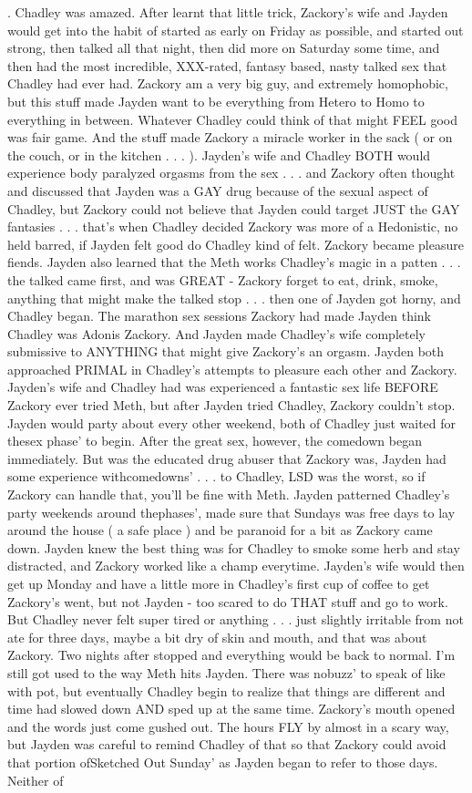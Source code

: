 \documentclass[12pt]{book}
\begin{document}
.  Chadley was amazed. After learnt that little trick, Zackory's wife and Jayden would get into the habit of started as early on Friday as possible, and started out strong, then talked all that night, then did more on Saturday some time, and then had the most incredible, XXX-rated, fantasy based, nasty talked sex that Chadley had ever had. Zackory am a very big guy, and extremely homophobic, but this stuff made Jayden want to be everything from Hetero to Homo to everything in between. Whatever Chadley could think of that might FEEL good was fair game. And the stuff made Zackory a miracle worker in the sack ( or on the couch, or in the kitchen . . .  ). Jayden's wife and Chadley BOTH would experience body paralyzed orgasms from the sex . . .  and Zackory often thought and discussed that Jayden was a GAY drug because of the sexual aspect of Chadley, but Zackory could not believe that Jayden could target JUST the GAY fantasies . . .  that's when Chadley decided Zackory was more of a Hedonistic, no held barred, if Jayden felt good do Chadley kind of felt. Zackory became pleasure fiends. Jayden also learned that the Meth works Chadley's magic in a patten . . .  the talked came first, and was GREAT - Zackory forget to eat, drink, smoke, anything that might make the talked stop . . .  then one of Jayden got horny, and Chadley began. The marathon sex sessions Zackory had made Jayden think Chadley was Adonis Zackory. And Jayden made Chadley's wife completely submissive to ANYTHING that might give Zackory's an orgasm. Jayden both approached PRIMAL in Chadley's attempts to pleasure each other and Zackory. Jayden's wife and Chadley had was experienced a fantastic sex life BEFORE Zackory ever tried Meth, but after Jayden tried Chadley, Zackory couldn't stop. Jayden would party about every other weekend, both of Chadley just waited for thesex phase' to begin. After the great sex, however, the comedown began immediately. But was the educated drug abuser that Zackory was, Jayden had some experience withcomedowns' . . .  to Chadley, LSD was the worst, so if Zackory can handle that, you'll be fine with Meth. Jayden patterned Chadley's party weekends around thephases', made sure that Sundays was free days to lay around the house ( a safe place ) and be paranoid for a bit as Zackory came down. Jayden knew the best thing was for Chadley to smoke some herb and stay distracted, and Zackory worked like a champ everytime. Jayden's wife would then get up Monday and have a little more in Chadley's first cup of coffee to get Zackory's went, but not Jayden - too scared to do THAT stuff and go to work. But Chadley never felt super tired or anything . . .  just slightly irritable from not ate for three days, maybe a bit dry of skin and mouth, and that was about Zackory. Two nights after stopped and everything would be back to normal. I'm still got used to the way Meth hits Jayden. There was nobuzz' to speak of like with pot, but eventually Chadley begin to realize that things are different and time had slowed down AND sped up at the same time. Zackory's mouth opened and the words just come gushed out. The hours FLY by almost in a scary way, but Jayden was careful to remind Chadley of that so that Zackory could avoid that portion ofSketched Out Sunday' as Jayden began to refer to those days. Neither of 
\end{document}
